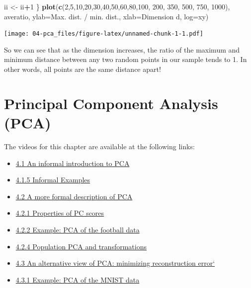 \documentclass[
]{book}
\newenvironment{Shaded}{\begin{snugshade}}{\end{snugshade}}
\newcommand{\AttributeTok}[1]{\textcolor[rgb]{0.13,0.29,0.53}{#1}}
\newcommand{\DecValTok}[1]{\textcolor[rgb]{0.00,0.00,0.81}{#1}}
\newcommand{\FunctionTok}[1]{\textcolor[rgb]{0.13,0.29,0.53}{\textbf{#1}}}
\newcommand{\NormalTok}[1]{#1}
\newcommand{\OtherTok}[1]{\textcolor[rgb]{0.56,0.35,0.01}{#1}}
\newcommand{\SpecialCharTok}[1]{\textcolor[rgb]{0.81,0.36,0.00}{\textbf{#1}}}
\newcommand{\StringTok}[1]{\textcolor[rgb]{0.31,0.60,0.02}{#1}}
\providecommand{\tightlist}{%
  \setlength{\itemsep}{0pt}\setlength{\parskip}{0pt}}
\theoremstyle{definition}
\theoremstyle{definition}
\theoremstyle{definition}
\theoremstyle{definition}
\theoremstyle{remark}
\begin{document}
\begin{Shaded}
\begin{Highlighting}[]
\NormalTok{  ii }\OtherTok{\textless{}{-}}\NormalTok{ ii}\SpecialCharTok{+}\DecValTok{1}
\NormalTok{\}}
\FunctionTok{plot}\NormalTok{(}\FunctionTok{c}\NormalTok{(}\DecValTok{2}\NormalTok{,}\DecValTok{5}\NormalTok{,}\DecValTok{10}\NormalTok{,}\DecValTok{20}\NormalTok{,}\DecValTok{30}\NormalTok{,}\DecValTok{40}\NormalTok{,}\DecValTok{50}\NormalTok{,}\DecValTok{60}\NormalTok{,}\DecValTok{80}\NormalTok{,}\DecValTok{100}\NormalTok{, }\DecValTok{200}\NormalTok{, }\DecValTok{350}\NormalTok{, }\DecValTok{500}\NormalTok{, }\DecValTok{750}\NormalTok{, }\DecValTok{1000}\NormalTok{), }
\NormalTok{     averatio, }\AttributeTok{ylab=}\StringTok{\textquotesingle{}Max. dist. / min. dist.\textquotesingle{}}\NormalTok{, }\AttributeTok{xlab=}\StringTok{\textquotesingle{}Dimension d\textquotesingle{}}\NormalTok{, }\AttributeTok{log=}\StringTok{\textquotesingle{}xy\textquotesingle{}}\NormalTok{)}
\end{Highlighting}
\end{Shaded}

\texttt{[image: 04-pca\_files/figure-latex/unnamed-chunk-1-1.pdf]}

So we can see that as the dimension increases, the ratio of the maximum and minimum distance between any two random points in our sample tends to 1. In other words, all points are the same distance apart!

\chapter{Principal Component Analysis (PCA)}\label{pca}

The videos for this chapter are available at the following links:

\begin{itemize}
\tightlist
\item
  \href{https://mediaspace.nottingham.ac.uk/media/PCA_Informal/1_zs9dumou}{4.1 An informal introduction to PCA}
\item
  \href{https://mediaspace.nottingham.ac.uk/media/PCA+Informal+Examples/1_3c9ghrtf}{4.1.5 Informal Examples}
\item
  \href{https://mediaspace.nottingham.ac.uk/media/PCA+Formal+Description/1_tq8tpcn0}{4.2 A more formal description of PCA}
\item
  \href{https://mediaspace.nottingham.ac.uk/media/PCAA+Properties+\%28edited\%29/1_vax8yhp9}{4.2.1 Properties of PC scores}
\item
  \href{https://mediaspace.nottingham.ac.uk/media/PCA+Football+Example/1_h70vgqq2}{4.2.2 Example: PCA of the football data}
\item
  \href{https://mediaspace.nottingham.ac.uk/media/Population+PCA+and+transformations/1_y1s2arei}{4.2.4 Population PCA and transformations}
\item
  \href{https://mediaspace.nottingham.ac.uk/media/PCAA+Minimizing+Reconstruction+Error/1_93tzf0ju}{4.3 An alternative view of PCA: minimizing reconstruction error`}
\item
  \href{https://mediaspace.nottingham.ac.uk/media/PCAA+MNIST+example/1_ljte3zc1}{4.3.1 Example: PCA of the MNIST data}
\end{itemize}
\end{document}
